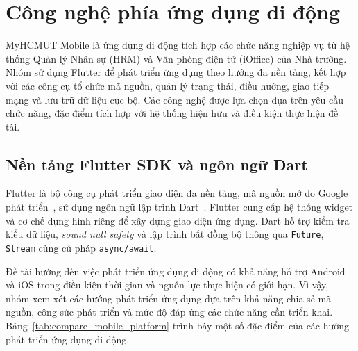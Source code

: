 \section{Công nghệ phía ứng dụng di động}
\label{sec:frontend_tech}

MyHCMUT Mobile là ứng dụng di động tích hợp các chức năng nghiệp vụ từ hệ thống Quản lý Nhân sự (HRM) và Văn phòng điện tử (iOffice) của Nhà trường. Nhóm sử dụng Flutter để phát triển ứng dụng theo hướng đa nền tảng, kết hợp với các công cụ tổ chức mã nguồn, quản lý trạng thái, điều hướng, giao tiếp mạng và lưu trữ dữ liệu cục bộ. Các công nghệ được lựa chọn dựa trên yêu cầu chức năng, đặc điểm tích hợp với hệ thống hiện hữu và điều kiện thực hiện đề tài.

\subsection{Nền tảng Flutter SDK và ngôn ngữ Dart}
\label{subsec:flutter_dart}

Flutter là bộ công cụ phát triển giao diện đa nền tảng, mã nguồn mở do Google phát triển~\cite{flutter_doc}, sử dụng ngôn ngữ lập trình Dart~\cite{dart_doc}. Flutter cung cấp hệ thống widget và cơ chế dựng hình riêng để xây dựng giao diện ứng dụng. Dart hỗ trợ kiểm tra kiểu dữ liệu, \textit{sound null safety} và lập trình bất đồng bộ thông qua \texttt{Future}, \texttt{Stream} cùng cú pháp \texttt{async/await}.

Đề tài hướng đến việc phát triển ứng dụng di động có khả năng hỗ trợ Android và iOS trong điều kiện thời gian và nguồn lực thực hiện có giới hạn. Vì vậy, nhóm xem xét các hướng phát triển ứng dụng dựa trên khả năng chia sẻ mã nguồn, công sức phát triển và mức độ đáp ứng các chức năng cần triển khai. Bảng~\ref{tab:compare_mobile_platform} trình bày một số đặc điểm của các hướng phát triển ứng dụng di động.

